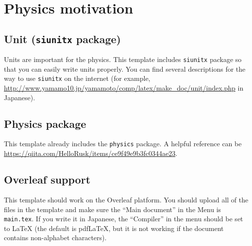 \chapter{Physics motivation}

\section{Unit (\texttt{siunitx} package)}

Units are important for the physics. This template includes \texttt{siunitx} package so that you can easily write units properly. You can find several descriptions for the way to use \texttt{siunitx} on the internet (for example, \url{http://www.yamamo10.jp/yamamoto/comp/latex/make_doc/unit/index.php} in Japanese).  

\section{Physics package}

This template already includes the \texttt{physics} package. A helpful reference can be \url{https://qiita.com/HelloRusk/items/ce9f49e9b3fc0344ae23}. 


\section{Overleaf support}

This template should work on the Overleaf platform. You should upload all of the files in the template and make sure the ``Main document'' in the Menu is \texttt{main.tex}. If you write it in Japanese, the ``Compiler'' in the menu should be set to LaTeX (the default is pdfLaTeX, but it is not working if the document contains non-alphabet characters). 
